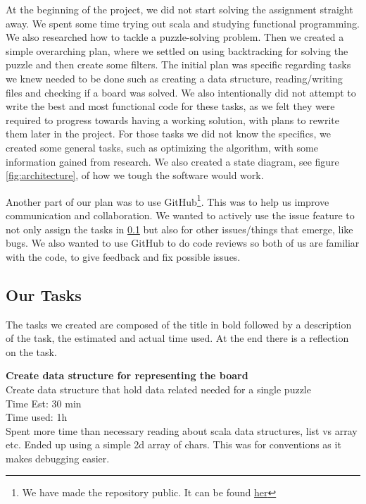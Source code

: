 \documentclass[12pt]{article}
\begin{document}
At the beginning of the project, we did not start solving the assignment straight away. We spent some time trying out scala and studying functional programming. We also researched how to tackle a puzzle-solving problem. Then we created a simple overarching plan, where we settled on using backtracking for solving the puzzle and then create some filters. The initial plan was specific regarding tasks we knew needed to be done such as creating a data structure, reading/writing files and checking if a board was solved. We also intentionally did not attempt to write the best and most functional code for these tasks, as we felt they were required to progress towards having a working solution, with plans to rewrite them later in the project. For those tasks we did not know the specifics, we created some general tasks, such as optimizing the algorithm, with some information gained from research. We also created a state diagram, see figure \ref{fig:architecture}, of how we tough the software would work.

Another part of our plan was to use GitHub\footnote{ We have made the repository public. It can be found \href{https://github.com/BANZZAAAIIII/IKT212_Akari}{her}}. This was to help us improve communication and collaboration. We wanted to actively use the issue feature to not only assign the tasks in \ref{our tasks} but also for other issues/things that emerge, like bugs. We also wanted to use GitHub to do code reviews so both of us are familiar with the code, to give feedback and fix possible issues. \newline


\subsection{Our Tasks}
\label{our tasks}
The tasks we created are composed of the title in bold followed by a description of the task, the estimated and actual time used. At the end there is a reflection on the task.

\textbf{Create data structure for representing the board}\\
Create data structure that hold data related needed for a single puzzle\\
Time Est: 30 min\\
Time used: 1h\\
Spent more time than necessary reading about scala data structures, list vs array etc. Ended up using a simple 2d array of chars. This was for conventions as it makes debugging easier.\\
\end{document}
